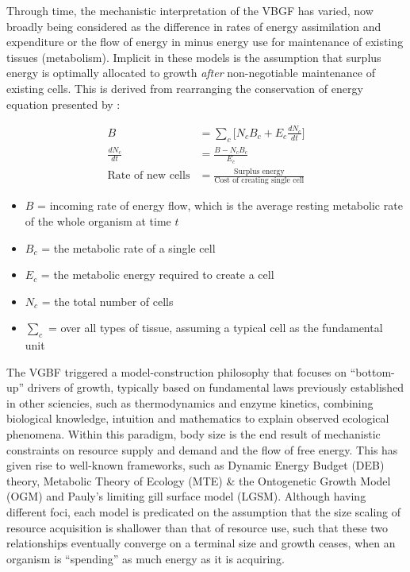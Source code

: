 \documentclass[a4paper]{article} %
\begin{document}
        Through time, the mechanistic interpretation of the VBGF has varied, now broadly being considered as the difference in rates of energy assimilation and expenditure or the flow of energy in minus energy use for maintenance of existing tissues (metabolism). Implicit in these models is the assumption that surplus energy is optimally allocated to growth \textit{after} non-negotiable maintenance of existing cells. This is derived from rearranging the conservation of energy equation presented by \cite{West2001}:

        \begin{align}
            B &= \sum_c \Bigg[N_{c}B_{c} + E_{c}\frac{dN_{c}}{dt}\Bigg] \\
            \frac{dN_{c}}{dt} &= \frac{B - N_{c}B_{c}}{E_{c}} \\
            \text{Rate of new cells} &= \frac{\text{Surplus energy}}{\text{Cost of creating single cell}}
        \end{align}

        \begin{itemize}            
            \item $B$ = incoming rate of energy flow, which is the average resting metabolic rate of the whole organism at time $t$
            \item $B_c$ = the metabolic rate of a single cell
            \item $E_c$ = the metabolic energy required to create a cell
            \item $N_c$ = the total number of cells
            \item $\sum\limits_c$ = over all types of tissue, assuming a typical cell as the fundamental unit
        \end{itemize}
        
        The VGBF triggered a model-construction philosophy that focuses on ``bottom-up'' drivers of growth, typically based on fundamental laws previously established in other sciencies, such as thermodynamics and enzyme kinetics, combining biological knowledge, intuition and mathematics to explain observed ecological phenomena. Within this paradigm, body size is the end result of mechanistic constraints on resource supply and demand and the flow of free energy. This has given rise to well-known frameworks, such as Dynamic Energy Budget (DEB) theory, Metabolic Theory of Ecology (MTE) \& the Ontogenetic Growth Model (OGM) and Pauly's limiting gill surface model (LGSM). Although having different foci, each model is predicated on the assumption that the size scaling of resource acquisition is shallower than that of resource use, such that these two relationships eventually converge on a terminal size and growth ceases, when an organism is ``spending'' as much energy as it is acquiring. 
        
\end{document}
